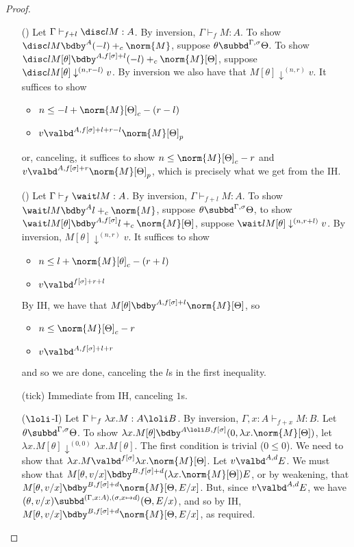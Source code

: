 \begin{proof}
\begin{itemize}
\item[(\discname)] Let $\Gamma \vdash_{f + l} \disc l M : A$.  By inversion, $\Gamma \vdash_f M : A$.
 To show $\disc l M \bdby^{A} (-l) +_c \norm{M}$, suppose $\theta \subbd^{\Gamma,\sigma} \Theta$. 
 To show $\disc l M[\theta] \bdby^{A,f[\sigma] + l} (-l) +_c \norm{M}[\Theta]$, suppose $\disc l M[\theta] \downarrow^{(n,r-l)} v$. 
 By inversion we also have that $M[\theta] \downarrow^{(n,r)} v$. 
 It suffices to show
 \begin{itemize}
   \item $n \leq -l + \norm{M}[\Theta]_c - (r - l)$
   \item $v \valbd^{A,f[\sigma] + l + r - l} \norm{M}[\Theta]_p$
 \end{itemize}
 or, canceling, it suffices to show $n \leq \norm{M}[\Theta]_c  - r$ and $v \valbd^{A,f[\sigma] + r} \norm{M}[\Theta]_p$, which is precisely what we get from the IH.

\item[(\waitname)] Let $\Gamma \vdash_f \wait l M : A$. By inversion, $\Gamma \vdash_{f+l} M : A$. To show $\wait l M \bdby^{A} l +_c \norm{M}$, suppose $\theta \subbd^{\Gamma,\sigma} \Theta$, 
to show $\wait l M[\theta] \bdby^{A,f[\sigma]} l +_c \norm{M}[\Theta]$, 
suppose $\wait l M[\theta] \downarrow^{(n,r+l)} v$. 
By inversion, $M[\theta] \downarrow^{(n,r)} v$.
It suffices to show
\begin{itemize}
  \item $n \leq l + \norm{M}[\theta]_c - (r + l)$
  \item $v \valbd^{f[\sigma] + r + l}$
\end{itemize}
By IH, we have that $M[\theta] \bdby^{A,f[\sigma] + l} \norm{M}[\Theta]$, so
\begin{itemize}
  \item $n \leq \norm{M}[\Theta]_c - r$
  \item $v \valbd^{A,f[\sigma] + l + r}$
\end{itemize}
and so we are done, canceling the $l$s in the first inequality.


\item[(tick)] Immediate from IH, canceling $1$s.

\item[($\loli$-I)] Let $\Gamma \vdash_f \lambda x.M : A \loli B$. By inversion, $\Gamma, x : A \vdash_{f + x} M : B$. 
Let $\theta \subbd^{\Gamma,\sigma} \Theta$. 
To show $\lambda x.M[\theta] \bdby^{A\loli B,f[\sigma]} (0,\lambda x.\norm{M}[\Theta])$, let $\lambda x.M[\theta] \downarrow^{(0,0)} \lambda x.M[\theta]$.
The first condition is trivial ($0 \leq 0$). We need to show that $\lambda x.M \valbd^{f[\sigma]} \lambda x.\norm{M}[\Theta]$. Let $v \valbd^{A,d} E$. We must show that $M[\theta,v/x] \bdby^{B,f[\sigma] + d} (\lambda x.\norm{M}[\Theta]) E$, or by weakening, that $M[\theta,v/x] \bdby^{B,f[\sigma]+d} \norm{M}[\Theta,E/x]$. But, since $v \valbd^{A,d} E$, we have $(\theta,v/x) \subbd^{(\Gamma,x:A),(\sigma, x \mapsto d)} (\Theta,E/x)$, and so by IH, $M[\theta,v/x] \bdby^{B,f[\sigma] + d} \norm{M}[\Theta,E/x]$, as required.


\end{itemize}
\end{proof}
